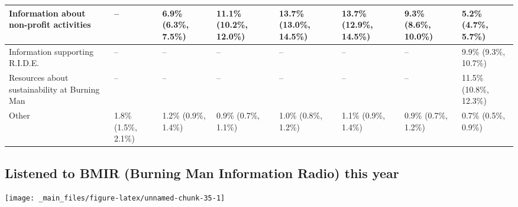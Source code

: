 \documentclass[
]{book}
\begin{document}
\begin{table}
\begin{tabular}[t]{>{}l|>{}l|>{}l|>{}l|>{}l|>{}l|>{}l|>{}l}
\hline
Information about non-profit 
 activities & -- & 6.9\% (6.3\%, 7.5\%) & 11.1\% (10.2\%, 12.0\%) & 13.7\% (13.0\%, 14.5\%) & 13.7\% (12.9\%, 14.5\%) & 9.3\% (8.6\%, 10.0\%) & 5.2\% (4.7\%, 5.7\%)\\
\hline
Information supporting R.I.D.E. & -- & -- & -- & -- & -- & -- & 9.9\% (9.3\%, 10.7\%)\\
\hline
Resources about sustainability 
 at Burning Man & -- & -- & -- & -- & -- & -- & 11.5\% (10.8\%, 12.3\%)\\
\hline
Other & 1.8\% (1.5\%, 2.1\%) & 1.2\% (0.9\%, 1.4\%) & 0.9\% (0.7\%, 1.1\%) & 1.0\% (0.8\%, 1.2\%) & 1.1\% (0.9\%, 1.4\%) & 0.9\% (0.7\%, 1.2\%) & 0.7\% (0.5\%, 0.9\%)\\
\hline
\end{tabular}
\end{table}

\hypertarget{listened-to-bmir-burning-man-information-radio-this-year}{%
\subsection{Listened to BMIR (Burning Man Information Radio) this year}\label{listened-to-bmir-burning-man-information-radio-this-year}}

\texttt{[image: \_main\_files/figure-latex/unnamed-chunk-35-1]}
\end{document}
